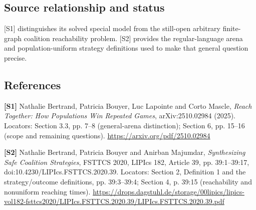 \documentclass[11pt,a4paper]{article}
\begin{document}
\subsection*{Source relationship and status}
[S1] distinguishes its solved special model from the still-open arbitrary finite-graph coalition reachability problem. [S2] provides the regular-language arena and population-uniform strategy definitions used to make that general question precise.
\subsection*{References}
\begingroup\footnotesize\raggedright
\textbf{[S1]} Nathalie Bertrand, Patricia Bouyer, Luc Lapointe and Corto Mascle, \emph{Reach Together: How Populations Win Repeated Games}, arXiv:2510.02984 (2025). Locators: Section 3.3, pp. 7--8 (general-arena distinction); Section 6, pp. 15--16 (scope and remaining questions). \url{https://arxiv.org/pdf/2510.02984}

\textbf{[S2]} Nathalie Bertrand, Patricia Bouyer and Anirban Majumdar, \emph{Synthesizing Safe Coalition Strategies}, FSTTCS 2020, LIPIcs 182, Article 39, pp. 39:1--39:17, doi:10.4230/LIPIcs.FSTTCS.2020.39. Locators: Section 2, Definition 1 and the strategy/outcome definitions, pp. 39:3--39:4; Section 4, p. 39:15 (reachability and nonuniform reaching times). \url{https://drops.dagstuhl.de/storage/00lipics/lipics-vol182-fsttcs2020/LIPIcs.FSTTCS.2020.39/LIPIcs.FSTTCS.2020.39.pdf}
\end{document}
